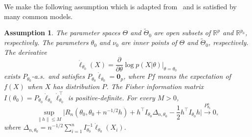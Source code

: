 \documentclass[11pt]{article}
\theoremstyle{plain}
\newtheorem{assumption}{\quad\quad Assumption}
\theoremstyle{definition}
\theoremstyle{remark}
\begin{document}
We make the following assumption which is adapted from~\cite{Kleijn2012The} and is satisfied by many common models. 
\begin{assumption}\label{Assumption1}
    The parameter spaces $\Theta$ and $\tilde{\Theta}_0$ are open subsets of $\mathbb{R}^p$ and $\mathbb{R}^{p_0}$, respectively.
    The parameters $\theta_0$ and $\nu_0$ are inner points of $\Theta$ and $\tilde{\Theta}_0$, respectively.
    The derivative 
$$\dot{\ell}_{\theta_0}(X)=\frac{\partial}{\partial \theta}\log p(X|\theta)\Big|_{\theta=\theta_0}$$
exists $P_{\theta_0}$-a.s.\ and satisfies $P_{\theta_0}\dot{\ell}_{\theta_0}=\mathbf{0}_p$, where $P f$ means the expectation of $f(X)$ when $X$ has distribution $P$.
The Fisher information matrix $I(\theta_0)=P_{\theta_0}\dot{\ell}_{\theta_0}\dot{\ell}_{\theta_0}^\top $ is positive-definite.
For every $M>0$,
    \begin{equation*}
        \sup_{\|h\|\leq M}\Big|
        R_n( \theta_0,\theta_0 + n^{-1/2 }h )
         +h^\top  I_{\theta_0}\Delta_{n,\theta_0}-\frac{1}{2}h^\top  I_{\theta_0}h
         \Big|\xrightarrow{P^n_{\theta_0}}0,
    \end{equation*}
    where $\Delta_{n,\theta_0}=n^{-1/2}\sum_{i=1}^n I_{\theta_0}^{-1}\dot{\ell}_{\theta_0}(X_i)$.
\end{assumption}     
\end{document}

